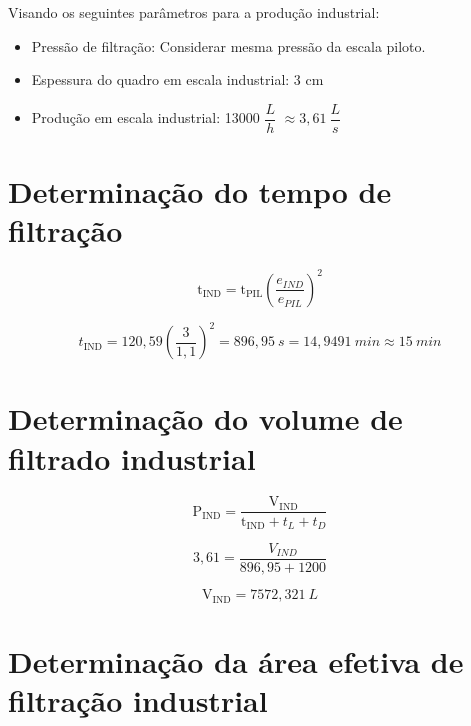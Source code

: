 Visando os seguintes parâmetros para a produção industrial:

\begin{itemize}
\item Pressão de filtração: Considerar mesma pressão da escala piloto.
\item Espessura do quadro em escala industrial: 3 cm 
\item Produção em escala industrial: 13000 $ \dfrac{L}{h} $ $ \approx 3,61 \ \dfrac{L}{s} $
\end{itemize}

\section{Determinação do tempo de filtração}


\begin{equation}\label{key}
\mathrm{t}_{\mathrm{IND}}=\mathrm{t}_{\mathrm{PIL}}\left(\frac{e_{I N D}}{e_{P I L}}\right)^{2}
\end{equation}


\begin{equation}\label{key}
t_{\mathrm{IND}}=120,59\left(\frac{3}{1,1}\right)^{2}=896,95\ s= 14,9491\ min \approx 15 \ min
\end{equation}

\section{Determinação do volume de filtrado industrial}




\begin{equation}\label{key}
\mathrm{P}_{\mathrm{IND}}=\frac{\mathrm{V}_{\mathrm{IND}}}{\mathrm{t}_{\mathrm{IND}}+t_{L}+t_{D}}
\end{equation}

\begin{equation}\label{key}
3,61=\frac{V_{I N D}}{896,95+1200}
\end{equation}


\begin{equation}\label{key}
\mathrm{V}_{\mathrm{IND}}=7572,321 \ L 
\end{equation}


\section{Determinação da área efetiva de filtração industrial}




